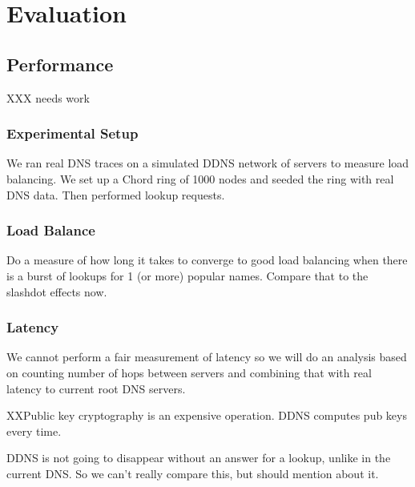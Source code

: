 \section{Evaluation}

\subsection{Performance}

XXX needs work

\subsubsection{Experimental Setup}

We ran real DNS traces on a simulated DDNS network
of servers to measure load balancing. We set up a
Chord ring of 1000 nodes and seeded the ring with 
real DNS data. Then performed lookup requests.

\subsubsection{Load Balance}

Do a measure of how long it takes to converge to good load 
balancing when there is a burst of lookups for 1 (or more)
popular names. Compare that to the slashdot effects now.

\subsubsection{Latency}

We cannot perform a fair measurement of latency so we will do an
analysis based on counting number of hops between servers
and combining that with real latency to current root DNS servers.

XXPublic key cryptography is an expensive operation. 
DDNS computes pub keys every time.

DDNS is not going to disappear without an answer for a lookup,
unlike in the current DNS. So we can't really compare this, but should
mention about it.
